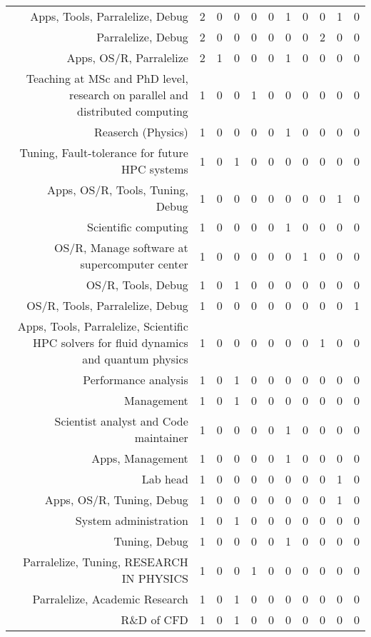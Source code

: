 {\begin{landscape}
\begin{longtable}[htb]{r|c|c|c|c|c|c|c|c|c|c}
{Apps, Tools, Parralelize, Debug} & 2 & 0 & 0 & 0 & 0 & 1 & 0 & 0 & 1 & 0 \\%
{Parralelize, Debug} & 2 & 0 & 0 & 0 & 0 & 0 & 0 & 2 & 0 & 0 \\%
{Apps, OS/R, Parralelize} & 2 & 1 & 0 & 0 & 0 & 1 & 0 & 0 & 0 & 0 \\%
{Teaching at MSc and PhD level, research on parallel and distributed computing} & 1 & 0 & 0 & 1 & 0 & 0 & 0 & 0 & 0 & 0 \\%
{Reaserch (Physics)} & 1 & 0 & 0 & 0 & 0 & 1 & 0 & 0 & 0 & 0 \\%
{Tuning, Fault-tolerance for future HPC systems} & 1 & 0 & 1 & 0 & 0 & 0 & 0 & 0 & 0 & 0 \\%
{Apps, OS/R, Tools, Tuning, Debug} & 1 & 0 & 0 & 0 & 0 & 0 & 0 & 0 & 1 & 0 \\%
{Scientific computing} & 1 & 0 & 0 & 0 & 0 & 1 & 0 & 0 & 0 & 0 \\%
{OS/R, Manage software at supercomputer center} & 1 & 0 & 0 & 0 & 0 & 0 & 1 & 0 & 0 & 0 \\%
{OS/R, Tools, Debug} & 1 & 0 & 1 & 0 & 0 & 0 & 0 & 0 & 0 & 0 \\%
{OS/R, Tools, Parralelize, Debug} & 1 & 0 & 0 & 0 & 0 & 0 & 0 & 0 & 0 & 1 \\%
{Apps, Tools, Parralelize, Scientific HPC solvers for fluid dynamics and quantum physics} & 1 & 0 & 0 & 0 & 0 & 0 & 0 & 1 & 0 & 0 \\%
{Performance analysis} & 1 & 0 & 1 & 0 & 0 & 0 & 0 & 0 & 0 & 0 \\%
{Management} & 1 & 0 & 1 & 0 & 0 & 0 & 0 & 0 & 0 & 0 \\%
{Scientist analyst and Code maintainer} & 1 & 0 & 0 & 0 & 0 & 1 & 0 & 0 & 0 & 0 \\%
{Apps, Management} & 1 & 0 & 0 & 0 & 0 & 1 & 0 & 0 & 0 & 0 \\%
{Lab head} & 1 & 0 & 0 & 0 & 0 & 0 & 0 & 0 & 1 & 0 \\%
{Apps, OS/R, Tuning, Debug} & 1 & 0 & 0 & 0 & 0 & 0 & 0 & 0 & 1 & 0 \\%
{System administration} & 1 & 0 & 1 & 0 & 0 & 0 & 0 & 0 & 0 & 0 \\%
{Tuning, Debug} & 1 & 0 & 0 & 0 & 0 & 1 & 0 & 0 & 0 & 0 \\%
{Parralelize, Tuning, RESEARCH IN PHYSICS} & 1 & 0 & 0 & 1 & 0 & 0 & 0 & 0 & 0 & 0 \\%
{Parralelize, Academic Research} & 1 & 0 & 1 & 0 & 0 & 0 & 0 & 0 & 0 & 0 \\%
{R\&D of CFD} & 1 & 0 & 1 & 0 & 0 & 0 & 0 & 0 & 0 & 0 \\%

\end{longtable}
\end{landscape}}
